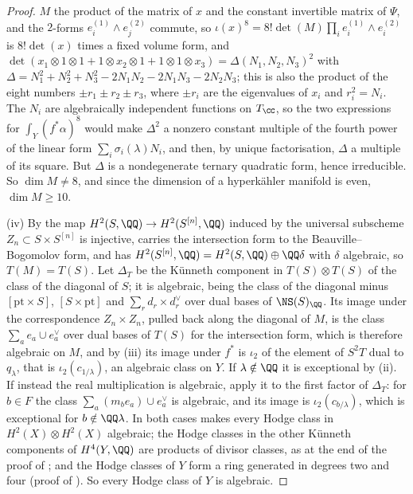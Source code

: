 \begin{proof}
$M$ the product of the matrix of $x$ and the constant invertible matrix of
$\Psi$, and the $2$-forms $e_{i}^{(1)}\wedge e_{j}^{(2)}$ commute, so
$\iota(x)^{8}=8!\det(M)\prod_{i}e_{i}^{(1)}\wedge e_{i}^{(2)}$ is $8!\det(x)$
times a fixed volume form, and
$\det(x_{1}\otimes1\otimes1+1\otimes x_{2}\otimes1+1\otimes1\otimes
x_{3})=\Delta(N_{1},N_{2},N_{3})^{2}$ with
$\Delta=N_{1}^{2}+N_{2}^{2}+N_{3}^{2}-2N_{1}N_{2}-2N_{1}N_{3}-2N_{2}N_{3}$;
this is also the product of the eight numbers $\pm r_{1}\pm r_{2}\pm r_{3}$,
where $\pm r_{i}$ are the eigenvalues of $x_{i}$ and $r_{i}^{2}=N_{i}$. The
$N_{i}$ are algebraically independent functions on $T_{\CC}$, so the two
expressions for $\int_{Y}(f^{*}\alpha)^{8}$ would make $\Delta^{2}$ a nonzero
constant multiple of the fourth power of the linear form
$\sum_{i}\sigma_{i}(\lambda)N_{i}$, and then, by unique factorisation,
$\Delta$ a multiple of its square. But $\Delta$ is a nondegenerate
ternary quadratic form, hence irreducible. So $\dim M\ne8$, and since the
dimension of a hyperk\"ahler manifold is even, $\dim M\ge10$.

(iv) By \cite{Bea83} the map $H^{2}(S,\QQ)\to H^{2}(S^{[n]},\QQ)$ induced by
the universal subscheme $Z_{n}\subset S\times S^{[n]}$ is injective, carries
the intersection form to the Beauville--Bogomolov form, and has
$H^{2}(S^{[n]},\QQ)=H^{2}(S,\QQ)\oplus\QQ\delta$ with $\delta$ algebraic, so
$T(M)=T(S)$. Let $\Delta_{T}$ be the K\"unneth component in $T(S)\otimes
T(S)$ of the class of the diagonal of $S$; it is algebraic, being the class
of the diagonal minus $[\mathrm{pt}\times S]$, $[S\times\mathrm{pt}]$ and
$\sum_{r}d_{r}\times d_{r}^{\vee}$ over dual bases of $\NS(S)_{\QQ}$. Its image
under the correspondence $Z_{n}\times Z_{n}$, pulled back along the diagonal
of $M$, is the class $\sum_{a}e_{a}\cup e_{a}^{\vee}$ over dual bases of
$T(S)$ for the intersection form, which is therefore algebraic on $M$, and by
(iii) its image under $f^{*}$ is $\iota_{2}$ of the element of $S^{2}T$ dual
to $q_{\lambda}$, that is $\iota_{2}(c_{1/\lambda})$, an algebraic class on
$Y$. If $\lambda\notin\QQ$ it is exceptional by (ii). If instead the real
multiplication is algebraic, apply it to the first factor of $\Delta_{T}$:
for $b\in F$ the class $\sum_{a}(m_{b}e_{a})\cup e_{a}^{\vee}$ is algebraic,
and its image is $\iota_{2}(c_{b/\lambda})$, which is exceptional for
$b\notin\QQ\lambda$. In both cases  makes every
Hodge class in $H^{2}(X)\otimes H^{2}(X)$ algebraic; the Hodge classes in the
other K\"unneth components of $H^{4}(Y,\QQ)$ are products of divisor classes,
as at the end of the proof of ; and the Hodge classes of
$Y$ form a ring generated in degrees two and four (proof of
). So every Hodge class of $Y$ is algebraic.
\end{proof}

